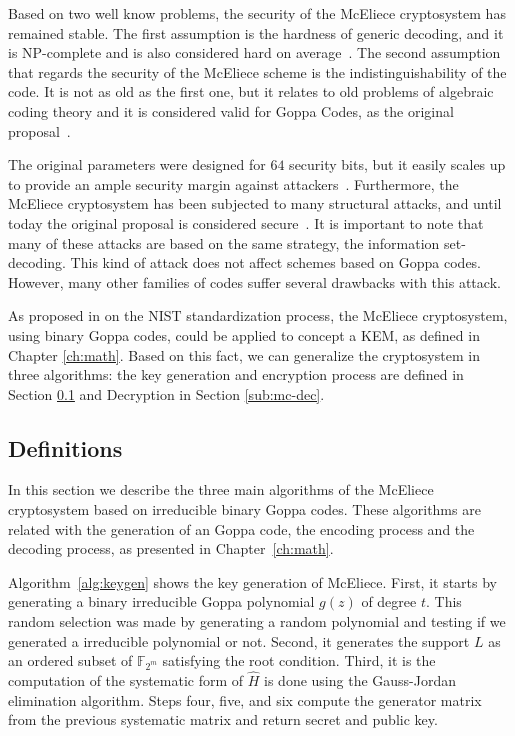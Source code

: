 Based on two well know problems, the security of the McEliece cryptosystem has remained stable. The first assumption is the hardness of generic decoding, and it is NP-complete and is also considered hard on average~\cite{berlekamp1978inherent}. The second assumption that regards the security of the McEliece scheme is the indistinguishability of the code. It is not as old as the first one, but it relates to old problems of algebraic coding theory and it is considered valid for Goppa Codes, as the original proposal~\cite{faugere2013distinguisher}. 

The original parameters were designed for ${64}$ security bits, but it easily scales up to provide an ample security margin against attackers~\cite{canteaut1998cryptanalysis}. Furthermore, the McEliece cryptosystem has been subjected to many structural attacks, and until today the original proposal is considered secure~\cite{bernstein2008attacking}. It is important to note that many of these attacks are based on the same strategy, the information set-decoding. This kind of attack does not affect schemes based on Goppa codes. However, many other families of codes suffer several drawbacks with this attack. 


As proposed in \cite{bernstein2017classic, bardet2017big} on the NIST standardization process, the McEliece cryptosystem, using binary Goppa codes, could be applied to concept a KEM, as defined in Chapter \ref{ch:math}. Based on this fact, we can generalize the cryptosystem in three algorithms: the key generation and encryption process are defined in Section \ref{sub:mc-def} and Decryption in Section \ref{sub:mc-dec}.

\subsection{Definitions}
\label{sub:mc-def}
In this section we describe the three main algorithms of the McEliece cryptosystem based on irreducible binary Goppa codes. These algorithms are related with the generation of an Goppa code, the encoding process and the decoding process, as presented in Chapter~\ref{ch:math}.

Algorithm~\ref{alg:keygen} shows the key generation of McEliece. First, it starts by generating a binary irreducible Goppa polynomial $g(z)$ of degree $t$. This random selection was made by generating a random polynomial and testing if we generated a irreducible polynomial or not.  Second, it generates the support $L$ as an ordered subset of $\mathbb{F}_{2^m}$ satisfying the root condition. Third, it is the computation of the systematic form of $\hat{H}$ is done using the Gauss-Jordan elimination algorithm. Steps four, five, and six compute the generator matrix from the previous systematic matrix and return secret and public key.


